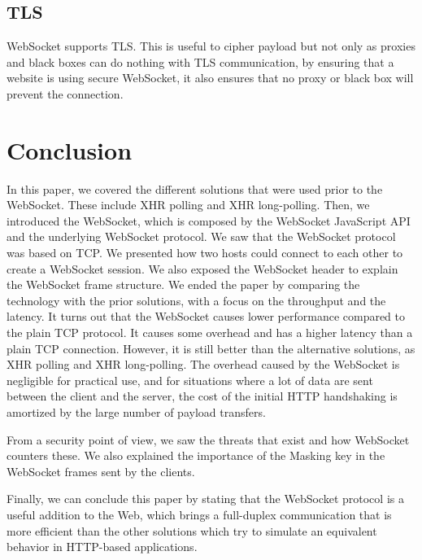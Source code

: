 \documentclass[10pt,journal,compsoc]{IEEEtran}
\newcommand{\ws}{WebSocket}
\begin{document}
\subsection{TLS}
\ws{} supports TLS.
This is useful to cipher payload but not only as proxies and black boxes can do nothing with TLS communication, by ensuring that a website is using secure \ws{}, it also ensures that no proxy or black box will prevent the connection.


\section{Conclusion}
In this paper, we covered the different solutions that were used prior to the \ws{}.
These include XHR polling and XHR long-polling.
Then, we introduced the \ws{}, which is composed by the \ws{} JavaScript API and the underlying \ws{} protocol.
We saw that the \ws{} protocol was based on TCP.
We presented how two hosts could connect to each other to create a \ws{} session.
We also exposed the \ws{} header to explain the \ws{} frame structure.
We ended the paper by comparing the technology with the prior solutions, with a focus on the throughput and the latency.
It turns out that the \ws{} causes lower performance compared to the plain TCP protocol.
It causes some overhead and has a higher latency than a plain TCP connection.
However, it is still better than the alternative solutions, as XHR polling and XHR long-polling.
The overhead caused by the \ws{} is negligible for practical use, and for situations where a lot of data are sent between the client and the server, the cost of the initial HTTP handshaking is amortized by the large number of payload transfers.

From a security point of view, we saw the threats that exist and how \ws{} counters these.
We also explained the importance of the Masking key in the \ws{} frames sent by the clients.

Finally, we can conclude this paper by stating that the \ws{} protocol is a useful addition to the Web, which brings a full-duplex communication that is more efficient than the other solutions which try to simulate an equivalent behavior in HTTP-based applications.

\ifCLASSOPTIONcaptionsoff
  \newpage
\fi




\end{document}
